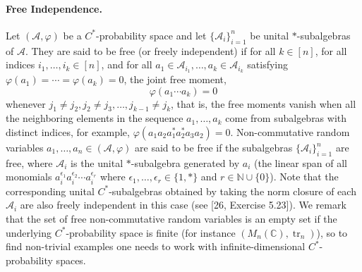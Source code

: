 \paragraph{Free Independence.}
Let $(\mathcal A,\varphi)$ be a $C^*$-probability space and let $\{\mathcal A_i\}_{i=1}^n$ be unital $*$-subalgebras of $\mathcal A$. They are said to be free (or freely independent) if for all $k\in[n]$, for all indices $i_1,\ldots,i_k\in[n]$, and for all $a_1\in\mathcal A_{i_1},\ldots,a_k\in\mathcal A_{i_k}$ satisfying $\varphi(a_1)=\cdots=\varphi(a_k)=0$, the joint free moment,
\[\varphi(a_1\cdots a_k)=0\]
whenever $j_1\neq j_2,j_2\neq j_3,\ldots,j_{k-1}\neq j_k$, that is, the free moments vanish when all the neighboring elements in the sequence $a_1,\ldots,a_k$ come from subalgebras with distinct indices, for example, $\varphi(a_1a_2a_1^*a_2^*a_3a_2)=0$.
Non-commutative random variables $a_1,\ldots,a_n\in(\mathcal A,\varphi)$ are said to be free if the subalgebras $\{\mathcal A_i\}_{i=1}^n$ are free, where $\mathcal A_i$ is the unital $*$-subalgebra generated by $a_i$ (the linear span of all monomials $a_i^{\epsilon_1}a_i^{\epsilon_2}\cdots a_i^{\epsilon_r}$ where $\epsilon_1,\ldots,\epsilon_r\in\{1,*\}$ and $r\in\mathbb N\cup\{0\}$). Note that the corresponding unital $C^*$-subalgebras obtained by taking the norm closure of each $\mathcal A_i$ are also freely independent in this case (see [26, Exercise 5.23]).
We remark that the set of free non-commutative random variables is an empty set if the underlying $C^*$-probability space is finite (for instance $(M_n(\mathbb C),\operatorname{tr}_n)$), so to find non-trivial examples one needs to work with infinite-dimensional $C^*$-probability spaces.
